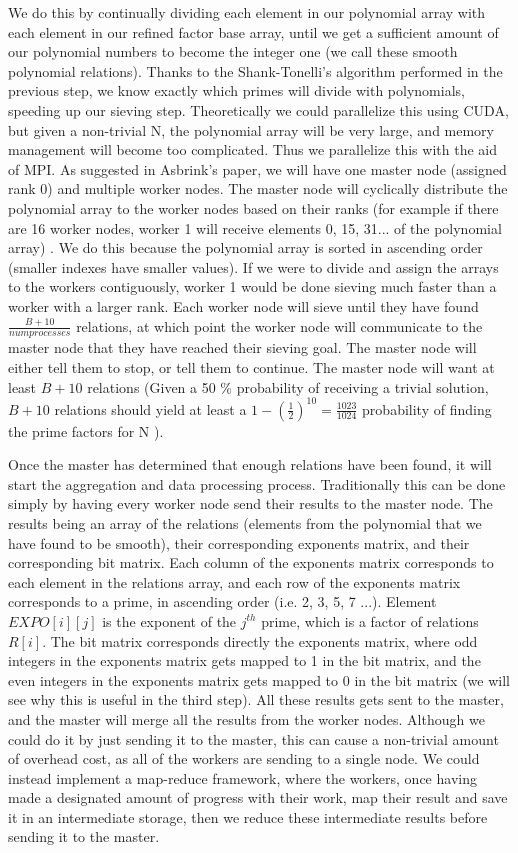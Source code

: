 \documentclass[11pt,twocolumn]{article}
\begin{document}
We do this by continually dividing each element in our polynomial array with each element in our refined factor base array, until we get a sufficient amount of our polynomial numbers to become the integer one (we call these smooth polynomial relations). Thanks to the Shank-Tonelli's algorithm performed in the previous step, we know exactly which primes will divide with polynomials, speeding up our sieving step. Theoretically we could parallelize this using CUDA, but given a non-trivial N, the polynomial array will be very large, and memory management will become too complicated. Thus we parallelize this with the aid of MPI. As suggested in Asbrink's paper, we will have one master node (assigned rank 0) and multiple worker nodes. The master node will cyclically distribute the polynomial array to the worker nodes based on their ranks (for example if there are 16 worker nodes, worker 1 will receive elements 0, 15, 31... of the polynomial array) \cite{asbrink:parallelqs}. We do this because the polynomial array is sorted in ascending order (smaller indexes have smaller values). If we were to divide and assign the arrays to the workers contiguously, worker 1 would be done sieving much faster than a worker with a larger rank. Each worker node will sieve until they have found $\frac{B+10}{numprocesses}$ relations, at which point the worker node will communicate to the master node that they have reached their sieving goal. The master node will either tell them to stop, or tell them to continue. The master node will want at least $B+10$ relations (Given a 50 \% probability of receiving a trivial solution, $B+10$ relations should yield at least a $1 - \left(\frac{1}{2} \right)^{10} = \frac{1023}{1024}$ probability of finding the prime factors for N \cite{asbrink:parallelqs}).

Once the master has determined that enough relations have been found, it will start the aggregation and data processing process. Traditionally this can be done simply by having every worker node send their results to the master node. The results being an array of the relations (elements from the polynomial that we have found to be smooth), their corresponding exponents matrix, and their corresponding bit matrix. Each column of the exponents matrix corresponds to each element in the relations array, and each row of the exponents matrix corresponds to a prime, in ascending order (i.e. 2, 3, 5, 7 ...). Element $EXPO[i][j]$ is the exponent of the $j^{th}$ prime, which is a factor of relations $R[i]$. The bit matrix corresponds directly the exponents matrix, where odd integers in the exponents matrix gets mapped to 1 in the bit matrix, and the even integers in the exponents matrix gets mapped to 0 in the bit matrix (we will see why this is useful in the third step). All these results gets sent to the master, and the master will merge all the results from the worker nodes. Although we could do it by just sending it to the master, this can cause a non-trivial amount of overhead cost, as all of the workers are sending to a single node. We could instead implement a map-reduce framework, where the workers, once having made a designated amount of progress with their work, map their result and save it in an intermediate storage, then we reduce these intermediate results before sending it to the master.
\end{document}
